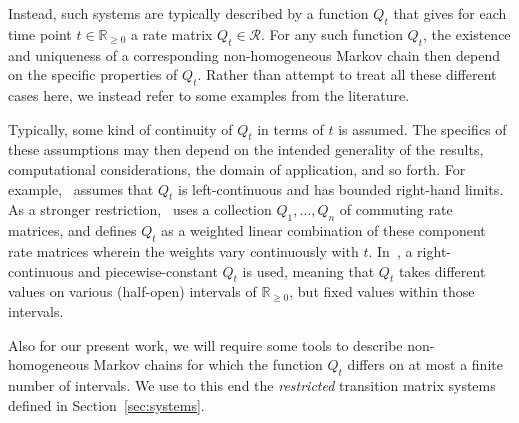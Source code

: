 \documentclass[10pt,a4paper]{paper}
\theoremstyle{definition}
\newcommand{\reals}{\mathbb{R}}
\newcommand{\realsnonneg}{\reals_{\geq 0}}
\begin{document}
Instead, such systems are typically described by a function $Q_t$ that gives for each time point $t\in\realsnonneg$ a rate matrix $Q_t\in\mathcal{R}$. For any such function $Q_t$, the existence and uniqueness of a corresponding non-homogeneous Markov chain then depend on the specific properties of $Q_t$. Rather than attempt to treat all these different cases here, we instead refer to some examples from the literature. 

Typically, some kind of continuity of $Q_t$ in terms of $t$ is assumed. The specifics of these assumptions may then depend on the intended generality of the results, computational considerations, the domain of application, and so forth. For example,~\cite{aalen1978empirical} assumes that $Q_t$ is left-continuous and has bounded right-hand limits. As a stronger restriction,~\cite{johnson1989nonhomogeneous} uses a collection $Q_1,\ldots,Q_n$ of commuting rate matrices, and defines $Q_t$ as a weighted linear combination of these component rate matrices wherein the weights vary continuously with $t$. In~\cite{rindos1995exact}, a right-continuous and piecewise-constant $Q_t$ is used, meaning that $Q_t$ takes different values on various (half-open) intervals of $\realsnonneg$, but fixed values within those intervals.

Also for our present work, we will require some tools to describe non-homogeneous Markov chains for which the function $Q_t$ differs on at most a finite number of intervals. We use to this end the \emph{restricted} transition matrix systems defined in Section~\ref{sec:systems}.




\end{document}
